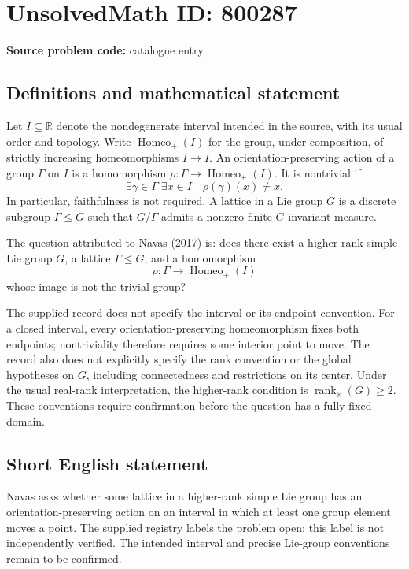 \documentclass[11pt]{article}
\newcommand{\R}{\mathbb{R}}
\begin{document}
\section*{UnsolvedMath ID: 800287}
\textbf{Source problem code:} catalogue entry
\subsection{Definitions and mathematical statement}
Let \(I\subseteq\R\) denote the nondegenerate interval intended in the source, with its usual order and topology. Write \(\operatorname{Homeo}_{+}(I)\) for the group, under composition, of strictly increasing homeomorphisms \(I\to I\). An orientation-preserving action of a group \(\Gamma\) on \(I\) is a homomorphism \(\rho:\Gamma\to\operatorname{Homeo}_{+}(I)\). It is nontrivial if
\[
\exists\gamma\in\Gamma\;\exists x\in I\quad \rho(\gamma)(x)\ne x.
\]
In particular, faithfulness is not required. A lattice in a Lie group \(G\) is a discrete subgroup \(\Gamma\leq G\) such that \(G/\Gamma\) admits a nonzero finite \(G\)-invariant measure.

The question attributed to Navas (2017) is: does there exist a higher-rank simple Lie group \(G\), a lattice \(\Gamma\leq G\), and a homomorphism
\[
\rho:\Gamma\longrightarrow\operatorname{Homeo}_{+}(I)
\]
whose image is not the trivial group?

The supplied record does not specify the interval or its endpoint convention. For a closed interval, every orientation-preserving homeomorphism fixes both endpoints; nontriviality therefore requires some interior point to move. The record also does not explicitly specify the rank convention or the global hypotheses on \(G\), including connectedness and restrictions on its center. Under the usual real-rank interpretation, the higher-rank condition is \(\operatorname{rank}_{\R}(G)\geq2\). These conventions require confirmation before the question has a fully fixed domain.
\subsection{Short English statement}
Navas asks whether some lattice in a higher-rank simple Lie group has an orientation-preserving action on an interval in which at least one group element moves a point. The supplied registry labels the problem open; this label is not independently verified. The intended interval and precise Lie-group conventions remain to be confirmed.
\end{document}
